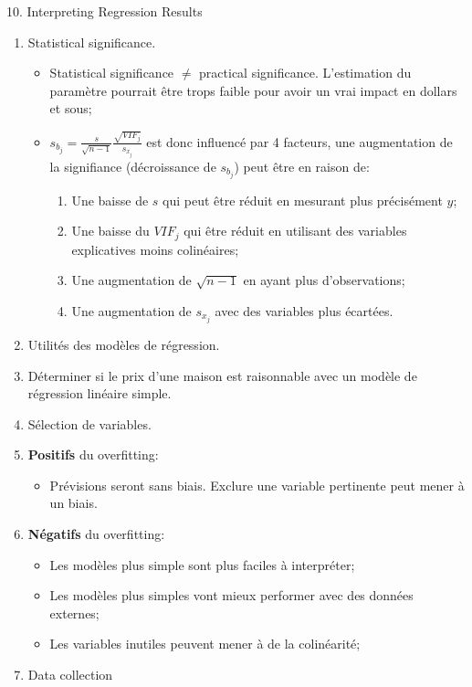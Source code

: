 \documentclass[12pt, titlepage, french]{report}
\begin{document}
\begin{CHPT_SUMM}{10. Interpreting Regression Results}
\begin{enumerate}
	\item	Statistical significance.
	\begin{itemize}
		\item	Statistical significance $\neq$ practical significance. L'estimation du paramètre pourrait être trops faible pour avoir un vrai impact en dollars et sous;
		\item	$s_{b_{j}} = \frac{s}{\sqrt{n - 1}}\frac{\sqrt{VIF_{j}}}{s_{x_{j}}}$ est donc influencé par 4 facteurs, une augmentation de la signifiance (décroissance de $s_{b_{j}}$) peut être en raison de:
		\begin{enumerate}
			\item	Une baisse de $s$ qui peut être réduit en mesurant plus précisément $y$;
			\item	Une baisse du $VIF_{j}$ qui être réduit en utilisant des variables explicatives moins colinéaires;
			\item	Une augmentation de $\sqrt{n - 1}$ en ayant plus d'observations;
			\item	Une augmentation de $s_{x_{j}}$ avec des variables plus écartées.
		\end{enumerate}
	\end{itemize}
	\item	Utilités des modèles de régression.
	\item[]	Déterminer si le prix d'une maison est raisonnable avec un modèle de régression linéaire simple.
	\item	Sélection de variables.
	\item[]	\textbf{Positifs} du overfitting:
	\begin{itemize}
		\item	Prévisions seront sans biais. Exclure une variable pertinente peut mener à un biais.
	\end{itemize}
	\item[]	\textbf{Négatifs} du overfitting:
	\begin{itemize}
		\item	Les modèles plus simple sont plus faciles à interpréter;
		\item	Les modèles plus simples vont mieux performer avec des données externes;
		\item	Les variables inutiles peuvent mener à de la colinéarité;
	\end{itemize}
	\item	Data collection

\end{enumerate}
\end{CHPT_SUMM}
\end{document}
